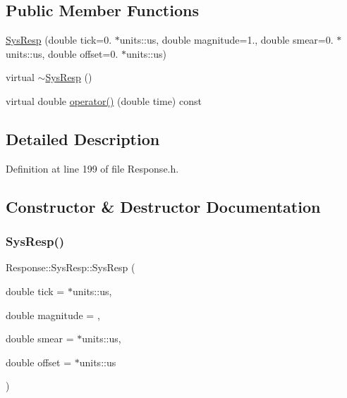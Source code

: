 \subsection*{Public Member Functions}
\begin{DoxyCompactItemize}
\item 
\hyperlink{class_wire_cell_1_1_response_1_1_sys_resp_a9f8d8bec9e6527311a3d9bfdf9bd3c55}{Sys\+Resp} (double tick=0. $\ast$units\+::us, double magnitude=1., double smear=0. $\ast$units\+::us, double offset=0. $\ast$units\+::us)
\item 
virtual \hyperlink{class_wire_cell_1_1_response_1_1_sys_resp_a25689ed533b091c96cd5b4bed5359e19}{$\sim$\+Sys\+Resp} ()
\item 
virtual double \hyperlink{class_wire_cell_1_1_response_1_1_sys_resp_a765f0e9bb4395c2b36344b07e3ee2762}{operator()} (double time) const
\end{DoxyCompactItemize}


\subsection{Detailed Description}


Definition at line 199 of file Response.\+h.



\subsection{Constructor \& Destructor Documentation}
\mbox{\label{class_wire_cell_1_1_response_1_1_sys_resp_a9f8d8bec9e6527311a3d9bfdf9bd3c55}} 
\subsubsection{\texorpdfstring{Sys\+Resp()}{SysResp()}}
{\footnotesize\ttfamily Response\+::\+Sys\+Resp\+::\+Sys\+Resp (\begin{DoxyParamCaption}\item[{double}]{tick = {$\ast$units\+:\+:us},  }\item[{double}]{magnitude = {},  }\item[{double}]{smear = {$\ast$units\+:\+:us},  }\item[{double}]{offset = {$\ast$units\+:\+:us} }\end{DoxyParamCaption})}



